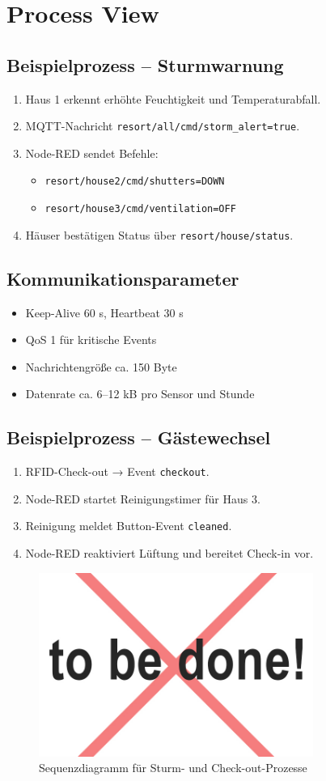 \section{Process View}
\subsection{Beispielprozess – Sturmwarnung}
\begin{enumerate}[noitemsep]
	\item Haus 1 erkennt erhöhte Feuchtigkeit und Temperaturabfall.
	\item MQTT-Nachricht \texttt{resort/all/cmd/storm\_alert=true}.
	\item Node-RED sendet Befehle:
	\begin{itemize}
		\item \texttt{resort/house2/cmd/shutters=DOWN}
		\item \texttt{resort/house3/cmd/ventilation=OFF}
	\end{itemize}
	\item Häuser bestätigen Status über \texttt{resort/{house}/status}.
\end{enumerate}

\subsection{Kommunikationsparameter}
\begin{itemize}[noitemsep]
	\item Keep-Alive 60 s, Heartbeat 30 s  
	\item QoS 1 für kritische Events  
	\item Nachrichtengröße ca. 150 Byte  
	\item Datenrate ca. 6–12 kB pro Sensor und Stunde
\end{itemize}

\subsection{Beispielprozess – Gästewechsel}
\begin{enumerate}[noitemsep]
	\item RFID-Check-out → Event \texttt{checkout}.
	\item Node-RED startet Reinigungstimer für Haus 3.
	\item Reinigung meldet Button-Event \texttt{cleaned}.
	\item Node-RED reaktiviert Lüftung und bereitet Check-in vor.
\end{enumerate}

\begin{figure}[h!]
	\centering
	\includegraphics[width=0.8\textwidth]{img/tbd.jpg}
	\caption{Sequenzdiagramm für Sturm- und Check-out-Prozesse}
	\label{fig:systemuebersicht}
\end{figure}

